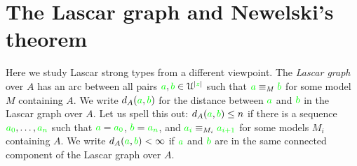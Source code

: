 \documentclass[creche.tex]{subfiles}
\begin{document}
\begin{comment}
\begin{proposition}\label{prop_exisntence_coheirs_over_sets}
Assume $A$ is a coheir extension base. Then every type $q({\mr x})\subseteq L(\U)$ almost satisfiable in $A$ has an extension to a global type almost satisfiable in $A$.
\end{proposition}

\begin{proof} 
As in the proof of Proposition~\ref{prop_exisntence_coheirs}. Let $p({\mr x})\subseteq L(\U)$ be maximal among the types containing $q({\mr x})$ and finitely satisfiable in $A$. We prove that $p({\mr x})$ is complete. If for a contradiction that $p({\mr x})$ contains neither $\psi({\mr x})$ nor $\neg\psi({\mr x})$. Then for some formula $\psi({\mr x})\in p$ neither $\psi({\mr x})\cup\big\{\psi({\mr x})\big\}$ nor $\psi({\mr x})\cup\big\{\neg\psi({\mr x})\big\}$ is finitely satisfiable in $A$. The disjunction of these two formulas is $\psi({\mr x})$. So, this contradicts the finite satisfiability of $p({\mr x})$.
\end{proof}



\end{comment}


\section{The Lascar graph and Newelski's theorem}\label{newelski}

Here we study Lascar strong types from a different viewpoint. The \emph{Lascar graph\/} over $A$ has an arc between all pairs ${\color{green} a},{\color{green} b}\in \EuScript U^{|{\color{green} z}|}$ such that  ${\color{green} a}\equiv_M{\color{green} b}$ for some model $M$ containing $A$. We write \emph{$d_A({\color{green} a},{\color{green} b})$\/} for the distance between ${\color{green} a}$ and ${\color{green} b}$ in the Lascar graph over $A$. Let us spell this out: $d_A({\color{green} a},{\color{green} b})\le n$ if there is a sequence ${\color{green} a_0},\dots,{\color{green} a_n}$ such that ${\color{green} a}={\color{green} a_0}$, ${\color{green} b}={\color{green} a_n}$, and ${\color{green} a_i}\equiv_{M_i}{\color{green} a_{i+1}}$ for some models $M_i$ containing $A$. We write \emph{$d_A({\color{green} a},{\color{green} b})<\infty$\/} if ${\color{green} a}$ and ${\color{green} b}$ are in the same connected component of the Lascar graph over $A$.
\end{document}
